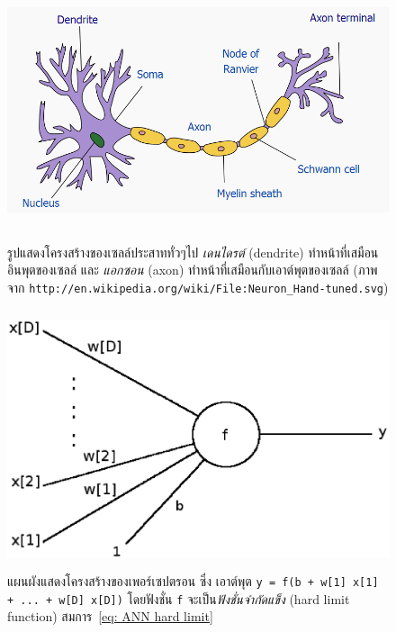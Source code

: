 %
\begin{figure}
\begin{center}
\includegraphics[height=3in]{04ANN/typicalNeuron.png}
\end{center}
\caption{รูปแสดงโครงสร้างของเซลล์ประสาททั่วๆไป
\textit{เดนไดรต์} (dendrite) ทำหน้าที่เสมือนอินพุตของเซลล์ 
และ \textit{แอกซอน} (axon) ทำหน้าที่เสมือนกับเอาต์พุตของเซลล์
{\footnotesize 
(ภาพจาก \texttt{http://en.wikipedia.org/wiki/File:Neuron\_Hand-tuned.svg})
}
}
\label{fig: ANN neuron}
\end{figure}
%

%
\begin{figure}
\begin{center}
\includegraphics[height=3in]{04ANN/perceptron.eps}
\end{center}
\caption{แผนผังแสดงโครงสร้างของเพอร์เซปตรอน ซึ่ง เอาต์พุต \texttt{y = f(b + w[1] x[1] + ... + w[D]  x[D])} โดยฟังชั่น \texttt{f} จะเป็น\textit{ฟังชั่นจำกัดแข็ง} (hard limit function) สมการ~\ref{eq: ANN hard limit}}
\label{fig: ANN perceptron}
\end{figure}
%

